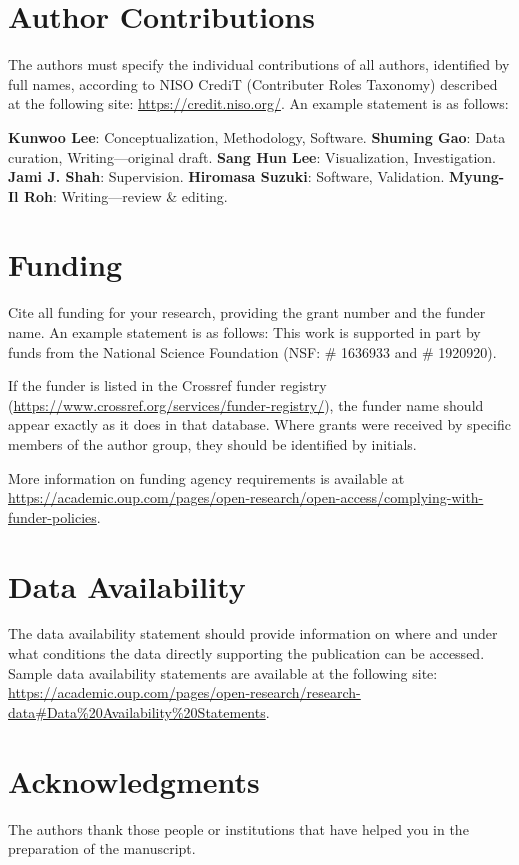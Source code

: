 \documentclass[12pt,a4paper]{article}
\begin{document}
\section*{Author Contributions}
The authors must specify the individual contributions of all authors, identified by full names, according to NISO CrediT (Contributer Roles Taxonomy) described at the following site: \url{https://credit.niso.org/}. An example statement is as follows:

\noindent\textbf{Kunwoo Lee}: Conceptualization, Methodology, Software. \textbf{Shuming Gao}: Data curation, Writing—original draft. \textbf{Sang Hun Lee}: Visualization, Investigation. \textbf{Jami J. Shah}: Supervision. \textbf{Hiromasa Suzuki}: Software, Validation. \textbf{Myung-Il Roh}: Writing—review \& editing.

\section*{Funding}
Cite all funding for your research, providing the grant number and the funder name. An example statement is as follows: This work is supported in part by funds from the National Science Foundation (NSF: \# 1636933 and \# 1920920). 

If the funder is listed in the Crossref funder registry (\url{https://www.crossref.org/services/funder-registry/}), the funder name should appear exactly as it does in that database. Where grants were received by specific members of the author group, they should be identified by initials. 

More information on funding agency requirements is available at  \url{https://academic.oup.com/pages/open-research/open-access/complying-with-funder-policies}.

\section*{Data Availability}
The data availability statement should provide information on where and under what conditions the data directly supporting the publication can be accessed. Sample data availability statements are available at the following site: \url{https://academic.oup.com/pages/open-research/research-data#Data%20Availability%20Statements}.

\section*{Acknowledgments}
The authors thank those people or institutions that have helped you in the preparation of the manuscript. 
\end{document}
